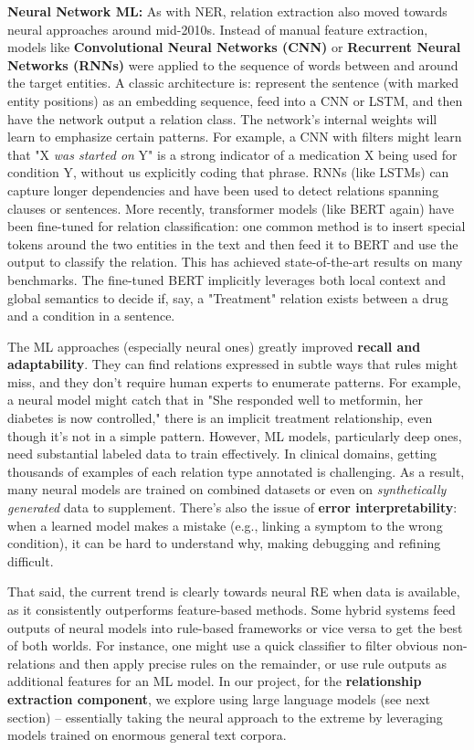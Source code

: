 \textbf{Neural Network ML:} As with NER, relation extraction also moved towards neural approaches around mid-2010s. Instead of manual feature extraction, models like \textbf{Convolutional Neural Networks (CNN)} or \textbf{Recurrent Neural Networks (RNNs)} were applied to the sequence of words between and around the target entities. A classic architecture is: represent the sentence (with marked entity positions) as an embedding sequence, feed into a CNN or LSTM, and then have the network output a relation class. The network's internal weights will learn to emphasize certain patterns. For example, a CNN with filters might learn that "X \emph{was started on} Y" is a strong indicator of a medication X being used for condition Y, without us explicitly coding that phrase. RNNs (like LSTMs) can capture longer dependencies and have been used to detect relations spanning clauses or sentences. More recently, transformer models (like BERT again) have been fine-tuned for relation classification: one common method is to insert special tokens around the two entities in the text and then feed it to BERT and use the output to classify the relation. This has achieved state-of-the-art results on many benchmarks. The fine-tuned BERT implicitly leverages both local context and global semantics to decide if, say, a "Treatment" relation exists between a drug and a condition in a sentence.

The ML approaches (especially neural ones) greatly improved \textbf{recall and adaptability}. They can find relations expressed in subtle ways that rules might miss, and they don't require human experts to enumerate patterns. For example, a neural model might catch that in "She responded well to metformin, her diabetes is now controlled," there is an implicit treatment relationship, even though it's not in a simple pattern. However, ML models, particularly deep ones, need substantial labeled data to train effectively. In clinical domains, getting thousands of examples of each relation type annotated is challenging. As a result, many neural models are trained on combined datasets or even on \emph{synthetically generated} data to supplement. There's also the issue of \textbf{error interpretability}: when a learned model makes a mistake (e.g., linking a symptom to the wrong condition), it can be hard to understand why, making debugging and refining difficult.

That said, the current trend is clearly towards neural RE when data is available, as it consistently outperforms feature-based methods. Some hybrid systems feed outputs of neural models into rule-based frameworks or vice versa to get the best of both worlds. For instance, one might use a quick classifier to filter obvious non-relations and then apply precise rules on the remainder, or use rule outputs as additional features for an ML model. In our project, for the \textbf{relationship extraction component}, we explore using large language models (see next section) – essentially taking the neural approach to the extreme by leveraging models trained on enormous general text corpora.

